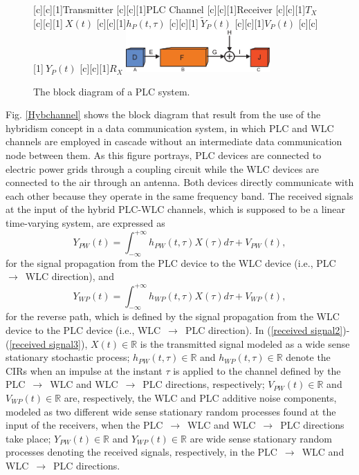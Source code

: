 \documentclass[journal]{IEEEtran}
\begin{document}
\begin{figure}[h]
	\centering
	[c][1]{Transmitter}
	[c][1]{PLC Channel}
	[c][1]{Receiver}
	[c][1]{$T_X$}
	[c][1]{$~X(t)$}
	[c][1]{$h_P(t,\tau)$}
	[c][1]{$~\tilde{Y}_P(t)$}
	[c][1]{$V_P(t)$}
	[c][1]{$~Y_P(t)$}
	[c][1]{$R_X$}
	\includegraphics[width=0.49\textwidth]{images/PLCchannel.eps}
	\caption{The block diagram of a PLC system.}
	\label{PLCchannel}
\end{figure}

Fig. \ref{Hybchannel} shows the block diagram that result from the use of the hybridism concept in a data communication system, in which \ac{PLC} and \ac{WLC} channels are employed in cascade without an intermediate data communication node between them. As this figure portrays, \ac{PLC} devices are connected to electric power grids through a coupling circuit while the \ac{WLC} devices are connected to the air through an antenna. Both devices directly communicate with each other because they operate in the same frequency band. The received signals at the input of the hybrid \ac{PLC}-\ac{WLC} channels, which is supposed to be a linear time-varying system, are expressed as
\begin{equation} \label{received signal2}
Y_{PW}(t) = \int_{-\infty}^{+\infty} h_{PW}(t,\tau) X(\tau) d\tau + V_{PW}(t),
\end{equation}
for the signal propagation from the \ac{PLC} device to the \ac{WLC} device (i.e., \ac{PLC}~$\rightarrow$~\ac{WLC} direction), and
\begin{equation} \label{received signal3}
Y_{WP}(t) = \int_{-\infty}^{+\infty} h_{WP}(t,\tau) X(\tau) d\tau + V_{WP}(t),
\end{equation}
for the reverse path, which is defined by the signal propagation from the \ac{WLC} device to the \ac{PLC} device (i.e., \ac{WLC}~$\rightarrow$~\ac{PLC} direction). In (\ref{received signal2})-(\ref{received signal3}),  $X(t)\in \mathbb{R}$ is the transmitted signal modeled as a wide sense stationary stochastic process; $h_{PW}(t,\tau)\in \mathbb{R}$ and $h_{WP}(t,\tau)\in \mathbb{R}$ denote the \acp{CIR} when an impulse at the instant $\tau$ is applied to the channel defined by the \ac{PLC}~$\rightarrow$~\ac{WLC} and \ac{WLC}~$\rightarrow$~\ac{PLC} directions, respectively; $V_{PW}(t)\in \mathbb{R}$ and $V_{WP}(t)\in \mathbb{R}$ are, respectively, the \ac{WLC} and \ac{PLC} additive noise components, modeled as two different wide sense stationary random processes found at the input of the receivers, when the \ac{PLC}~$\rightarrow$~\ac{WLC} and \ac{WLC}~$\rightarrow$~\ac{PLC} directions take place; $Y_{PW}(t)\in \mathbb{R}$ and ${Y}_{WP}(t)\in \mathbb{R}$ are wide sense stationary random processes denoting the received signals, respectively, in the \ac{PLC}~$\rightarrow$~\ac{WLC} and \ac{WLC}~$\rightarrow$~\ac{PLC} directions.
\end{document}

